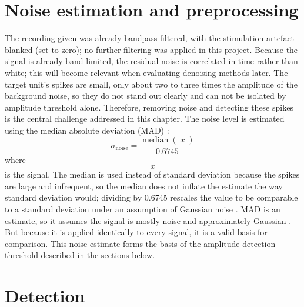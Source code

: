 \documentclass[ %
                    author={Daniel Page},
                supervisor={Dr. Andrew Calway},
                    degree={MSc},
                     title={Some Structural Guidelines for Data Science MSc Theses, Including Those With Long Titles that Run Across Multiple Lines on the Front Page},
                  subtitle={And those including an optional subtitle too, for good measure},
                      type={},
                      year={2021}]{dissertation}
\begin{document}
\section{Noise estimation and preprocessing}
The recording given was already bandpass-filtered, with the stimulation artefact blanked (set to zero); no further filtering was applied in this project. Because the signal is already band-limited, the residual noise is correlated in time rather than white; this will become relevant when evaluating denoising methods later.
The target unit's spikes are small, only about two to three times the amplitude of the background noise, so they do not stand out clearly and can not be isolated by amplitude threshold alone. Therefore, removing noise and detecting these spikes is the central challenge addressed in this chapter. 
The noise level is estimated using the median absolute deviation (MAD) \cite{quiroga_unsupervised_2004, park_deep_2019}:
\begin{equation}
    \sigma_{\text{noise}} = \frac{\operatorname{median}(|x|)}{0.6745}
\end{equation}
where \[x\] is the signal. 
The median is used instead of standard deviation because the spikes are large and infrequent, so the median does not inflate the estimate the way standard deviation would; dividing by 0.6745 rescales the value to be comparable to a standard deviation under an assumption of Gaussian noise \cite{drebitz_optimizing_2019}. MAD is an estimate, so it assumes the signal is mostly noise and approximately Gaussian \cite{coupe_robust_2010}. But because it is applied identically to every signal, it is a valid basis for comparison. This noise estimate forms the basis of the amplitude detection threshold described in the sections below. 

\section{Detection}
\end{document}
